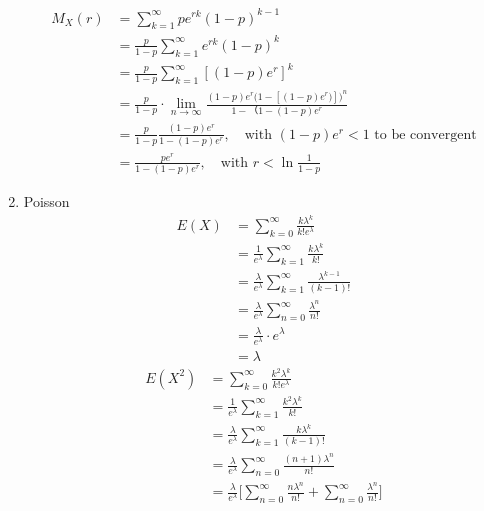 \documentclass[UTF8]{article}
\begin{document}
\begin{enumerate}
        \begin{equation*}
            \begin{split}
                M_X(r) &= \sum^\infty_{k=1}pe^{rk}(1-p)^{k-1}\\
                &=\frac{p}{1-p}\sum^\infty_{k=1}e^{rk}(1-p)^{k}\\
                &=\frac{p}{1-p}\sum^\infty_{k=1}[(1-p)e^r]^k\\
                &=\frac{p}{1-p}\cdot\lim_{n\rightarrow\infty}\frac{(1-p)e^r\big(1-[(1-p)e^r)]\big)^n}{1-（1-(1-p)e^r}\\
                &=\frac{p}{1-p}\frac{(1-p)e^r}{1-(1-p)e^r},\quad\text{with $(1-p)e^r<1$ to be convergent}\\
                &=\frac{pe^r}{1-(1-p)e^r},\quad\text{with $r<\ln\frac{1}{1-p}$}
            \end{split}            
        \end{equation*}
        \item Poisson
            \begin{equation*}
                \begin{split}
                    E(X) &= \sum^\infty_{k=0}\frac{k\lambda^k}{k!e^\lambda}\\
                    &=\frac{1}{e^\lambda}\sum^\infty_{k=1}\frac{k\lambda^k}{k!}\\
                    &=\frac{\lambda}{e^\lambda}\sum^\infty_{k=1}\frac{\lambda^{k-1}}{(k-1)!}\\
                    &=\frac{\lambda}{e^\lambda}\sum^\infty_{n=0}\frac{\lambda^n}{n!}\\
                    &=\frac{\lambda}{e^\lambda}\cdot e^\lambda\\
                    &=\lambda
                \end{split}
            \end{equation*}
            \begin{equation*}
                \begin{split}
                    E(X^2) &=\sum^\infty_{k=0}\frac{k^2\lambda^k}{k!e^\lambda}\\
                    &=\frac{1}{e^\lambda}\sum^\infty_{k=1}\frac{k^2\lambda^k}{k!}\\
                    &=\frac{\lambda}{e^\lambda}\sum^\infty_{k=1}\frac{k\lambda^k}{(k-1)!}\\
                    &=\frac{\lambda}{e^\lambda}\sum^\infty_{n=0}\frac{(n+1)\lambda^n}{n!}\\
                    &=\frac{\lambda}{e^\lambda}\bigg[\sum^\infty_{n=0}\frac{n\lambda^n}{n!}+\sum^\infty_{n=0}\frac{\lambda^n}{n!}\bigg]\\

\end{split}
\end{equation*}
\end{enumerate}
\end{document}
